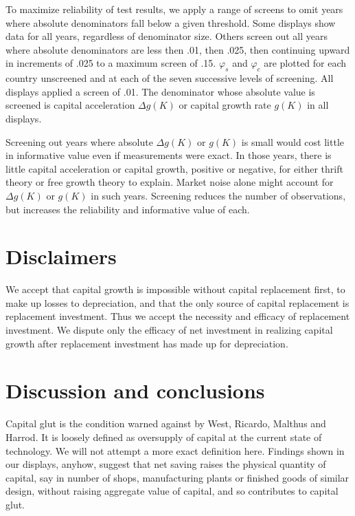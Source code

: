 \documentclass[a4paper,fleqn]{latex_styles/cas-sc}
\begin{document}
To maximize reliability of test results, we apply a range of screens to
omit years where absolute denominators fall below a given
threshold. Some displays show data for all years, regardless of denominator size.
Others screen out all years where
absolute denominators are less then .01, then .025, then continuing upward in
increments of .025 to a maximum screen of .15. \(\varphi_s\) and
\(\varphi_c\) are plotted for each country unscreened and at each of the
seven successive levels of screening. All displays applied a screen of .01. 
The denominator whose absolute value is screened is capital acceleration
$\Delta g(K)$ or capital growth rate \(g(K)\) in all displays. 

Screening out years where absolute \(\Delta g(K)\) or $g(K)$ is small would cost
little in informative value even if measurements were exact. In those
years, there is little capital acceleration or capital growth, positive or negative, for
either thrift theory or free growth theory to explain. Market noise
alone might account for \(\Delta g(K)\) or $g(K)$ in such years. Screening reduces
the number of observations, but increases the reliability and
informative value of each.

\hypertarget{disclaimers}{%
\section{Disclaimers}\label{disclaimers}}

We accept that capital growth is impossible without capital replacement first, to make up losses to depreciation, and that the only source of capital replacement is replacement investment. Thus we accept the necessity and efficacy of replacement investment. We dispute only the efficacy of net investment in realizing capital growth after replacement investment has made up for depreciation.

\hypertarget{discussion-and-conclusions}{%
\section{Discussion and conclusions}\label{discussion-and-conclusions}}

Capital glut is the condition warned against by West, Ricardo, Malthus
and Harrod. It is loosely defined as oversupply of capital at the
current state of technology. We will not attempt a more exact definition
here. Findings shown in our displays, anyhow, suggest that net
saving raises the physical quantity of capital, say in number of
shops, manufacturing plants or finished goods of similar design, without
raising aggregate value of capital, and so contributes to capital glut.
\end{document}
